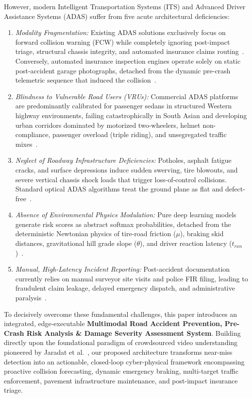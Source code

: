 \documentclass[journal,compsoc]{IEEEtran}
\begin{document}
However, modern Intelligent Transportation Systems (ITS) and Advanced Driver Assistance Systems (ADAS) suffer from five acute architectural deficiencies:
\begin{enumerate}
    \item \textit{Modality Fragmentation:} Existing ADAS solutions exclusively focus on forward collision warning (FCW) while completely ignoring post-impact triage, structural chassis integrity, and automated insurance claims routing~\cite{xiang2021deep, bao2020drive}. Conversely, automated insurance inspection engines operate solely on static post-accident garage photographs, detached from the dynamic pre-crash telemetric sequence that induced the collision~\cite{he2016deep, chawathe2022two}.
    \item \textit{Blindness to Vulnerable Road Users (VRUs):} Commercial ADAS platforms are predominantly calibrated for passenger sedans in structured Western highway environments, failing catastrophically in South Asian and developing urban corridors dominated by motorized two-wheelers, helmet non-compliance, passenger overload (triple riding), and unsegregated traffic mixes~\cite{chawathe2022two, silva2022deep}.
    \item \textit{Neglect of Roadway Infrastructure Deficiencies:} Potholes, asphalt fatigue cracks, and surface depressions induce sudden swerving, tire blowouts, and severe vertical chassis shock loads that trigger loss-of-control collisions. Standard optical ADAS algorithms treat the ground plane as flat and defect-free~\cite{mathavan2015review, buza2019pothole}.
    \item \textit{Absence of Environmental Physics Modulation:} Pure deep learning models generate risk scores as abstract softmax probabilities, detached from the deterministic Newtonian physics of tire-road friction ($\mu$), braking skid distances, gravitational hill grade slope ($\theta$), and driver reaction latency ($t_{rxn}$)~\cite{rajamani2012vehicle, treiber2013traffic}.
    \item \textit{Manual, High-Latency Incident Reporting:} Post-accident documentation currently relies on manual surveyor site visits and police FIR filing, leading to fraudulent claim leakage, delayed emergency dispatch, and administrative paralysis~\cite{kumar2023blockchain}.
\end{enumerate}

To decisively overcome these fundamental challenges, this paper introduces an integrated, edge-executable \textbf{Multimodal Road Accident Prevention, Pre-Crash Risk Analysis \& Damage Severity Assessment System}. Building directly upon the foundational paradigm of crowdsourced video understanding pioneered by Jaradat et al.~\cite{jaradat2025leveraging}, our proposed architecture transforms near-miss detection into an actionable, closed-loop cyber-physical framework encompassing proactive collision forecasting, dynamic emergency braking, multi-target traffic enforcement, pavement infrastructure maintenance, and post-impact insurance triage.
\end{document}
